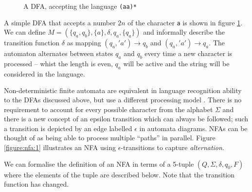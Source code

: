 \documentclass[a4paper,openany]{book}
\begin{document}
\begin{figure}[H]
\begin{MyMdframed}
\vspace{0.5em}


\caption{\label{figure:dfa:1} A DFA, accepting the language \texttt{(aa)*}}
\vspace{0.5em}
\captionsetup{style=default}


\vspace{0.5em}

\end{MyMdframed}

\end{figure}

A simple DFA that accepts a number $2n$ of the character \texttt{a} is shown in figure \ref{figure:dfa:1}. We can define $M = (\{q_a,q_b\}, \{a\}, \delta, q_a, \{q_a\})$ and informally describe the transition function $\delta$ as mapping $(q_a, 'a') \rightarrow q_b$ and $(q_a, 'a') \rightarrow q_a$. The automaton alternates between states $q_a$ and $q_b$ every time a new character is processed -- whist the length is even, $q_a$ will be active and the string will be considered in the language.

Non-deterministic finite automata are equivalent in language recognition ability to the DFAs discussed above, but use a different processing model \citep[p.~46]{sipser2012introduction}. There is no requirement to account for every possible character from the alphabet $\Sigma$ and there is a new concept of an epsilon transition which can always be followed; such a transition is depicted by an edge labelled $\epsilon$ in automata diagrams. NFAs can be thought of as being able to process multiple ``paths'' in parallel. Figure \ref{figure:nfa:1} illustrates an NFA using $\epsilon$-transitions to capture \emph{alternation}.

We can formalise the definition of an NFA in terms of a 5-tuple $(Q, \Sigma, \delta, q_0, F)$ where the elements of the tuple are described below. Note that the transition function has changed.
\end{document}
